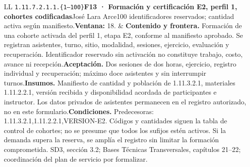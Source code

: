 \begin{longtable}{L{\tabcolsep\relax}L{\tabcolsep\relax}}
\texttt{1.\allowbreak{}11.\allowbreak{}7.\allowbreak{}2.\allowbreak{}1.\allowbreak{}1.\allowbreak{}\{1--100\}}\newline{}\textbf{F13 · Formación y certificación E2, perfil 1, cohortes codificadas}\newline{}José Lara Arce\newline{}100 identificadores reservados; cantidad activa según manifiesto.\newline{}\textbf{Ventana:} 18. & \textbf{Contenido y frontera.} Formación de una cohorte activada del perfil 1, etapa E2, conforme al manifiesto aprobado. Se registran asistentes, turno, sitio, modalidad, sesiones, ejercicio, evaluación y recuperación. Identificador reservado sin activación no constituye trabajo, costo, avance ni recepción.\newline{}\textbf{Aceptación.} Dos sesiones de dos horas, ejercicio, registro individual y recuperación; máximo doce asistentes y sin interrumpir turnos.\newline{}\textbf{Insumos.} Manifiesto de cantidad y población de 1.11.3.2.1, materiales 1.11.2.2.1, versión recibida y disponibilidad acordada de participantes e instructor. Los datos privados de asistentes permanecen en el registro autorizado, no en este formulario.\newline{}\textbf{Condiciones.} Predecesoras: 1.11.3.2.1,1.11.2.2.1,VERSION-E2. Códigos y cantidades siguen la tabla de control de cohortes; no se presume que todos los sufijos estén activos. Si la demanda supera la reserva, se amplía el registro sin limitar la formación comprometida. SD3, sección 3.2; Bases Técnicas Transversales, capítulos 21--22; coordinación del plan de servicio por formalizar.\\\hline

\end{longtable}
